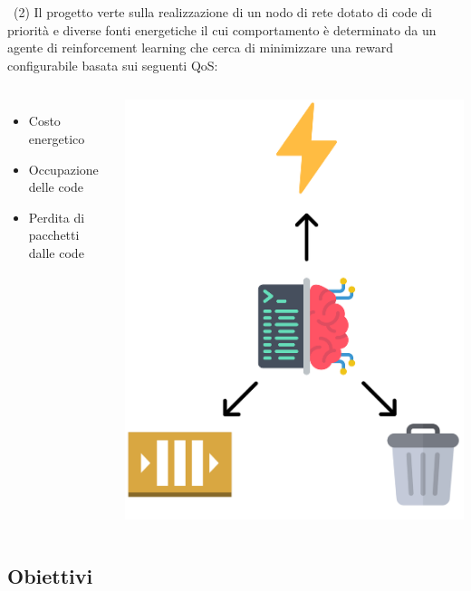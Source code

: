 \documentclass[compress]{beamer}
\begin{document}
\begin{frame}{\subsecname\ (2)}
    Il progetto verte sulla realizzazione di un nodo di rete dotato di code di priorità e diverse fonti energetiche il cui comportamento è determinato da un agente di reinforcement learning che cerca di minimizzare una reward configurabile basata sui seguenti QoS:
    \begin{columns}
            \begin{minipage}[b]{1\textwidth}
                \begin{itemize}
                    \item Costo energetico
                    \item Occupazione delle code
                    \item Perdita di pacchetti dalle code 
                \end{itemize}
            \end{minipage}
                \begin{minipage}{1\textwidth}
                    \begin{adjustbox}{margin=0cm 0cm 0cm 0cm, center} %
                        \includegraphics[width=.65\textwidth]{figs/agent_icon.png}
                    \end{adjustbox}
                \end{minipage}
    \end{columns}
\end{frame}
\subsection{Obiettivi}
\end{document}
